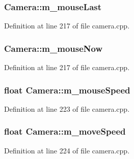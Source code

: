 \hypertarget{struct_camera_a3b6e6d6ac02cb9bcd549562ae24c3a81}{
\subsubsection[{m\+\_\+mouse\+Last}]{ Camera\+::m\+\_\+mouse\+Last}}\label{struct_camera_a3b6e6d6ac02cb9bcd549562ae24c3a81}


Definition at line 217 of file camera.\+cpp.

\hypertarget{struct_camera_ac77261134d252718b359076f40e3d8af}{
\subsubsection[{m\+\_\+mouse\+Now}]{ Camera\+::m\+\_\+mouse\+Now}}\label{struct_camera_ac77261134d252718b359076f40e3d8af}


Definition at line 217 of file camera.\+cpp.

\hypertarget{struct_camera_a650b9964d4427e06d4d1ef75e24f987c}{
\subsubsection[{m\+\_\+mouse\+Speed}]{\setlength{\rightskip}{0pt plus 5cm}float Camera\+::m\+\_\+mouse\+Speed}}\label{struct_camera_a650b9964d4427e06d4d1ef75e24f987c}


Definition at line 223 of file camera.\+cpp.

\hypertarget{struct_camera_ae647c41f37e1d598e7165a50ae78d997}{
\subsubsection[{m\+\_\+move\+Speed}]{\setlength{\rightskip}{0pt plus 5cm}float Camera\+::m\+\_\+move\+Speed}}\label{struct_camera_ae647c41f37e1d598e7165a50ae78d997}


Definition at line 224 of file camera.\+cpp.

